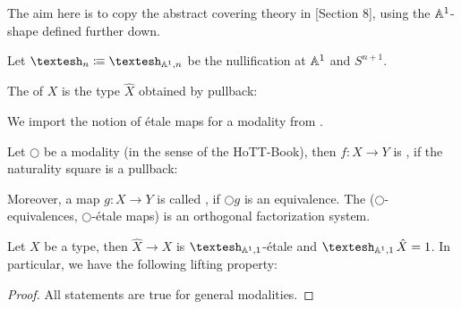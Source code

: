 The aim here is to copy the abstract covering theory in \cite{cherubini_rijke_2021}[Section 8],
using the $\mathbb{A}^1$-shape defined further down.

\begin{definition}
  Let $\shape_n\colonequiv\shape_{\A^1,n}$ be the nullification at $\mathbb{A}^1$ and $S^{n+1}$.
\end{definition}

\begin{definition}
  The  of $X$ is the type $\hat{X}$ obtained by pullback:
  \begin{center}
  \end{center}
\end{definition}

We import the notion of étale maps for a modality from \cite{cherubini_rijke_2021}.

\begin{definition}
  Let $\bigcirc$ be a modality (in the sense of the HoTT-Book),
  then $f:X\to Y$ is , if the naturality square is a pullback:
  \begin{center}
  \end{center}
  Moreover, a map $g:X\to Y$ is called ,
  if $\bigcirc g$ is an equivalence.
  The ($\bigcirc$-equivalences, $\bigcirc$-étale maps) is an orthogonal factorization system. 
\end{definition}

\begin{proposition}
  Let $X$ be a type, then $\hat{X}\to X$ is $\shape_{\A^1,1}$-étale and $\shape_{\A^1,1}\hat{X}=1$.
  In particular, we have the following lifting property:
  \begin{center}
  \end{center}
\end{proposition}

\begin{proof}
  All statements are true for general modalities.
\end{proof}
